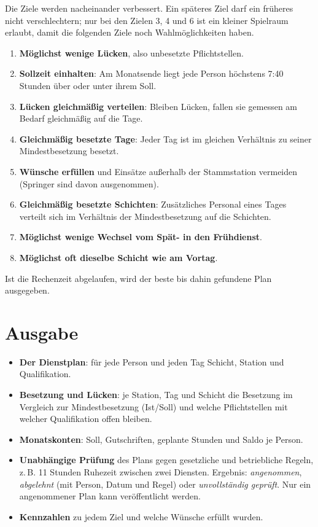\documentclass[11pt]{combiArticle}
\begin{document}
Die Ziele werden nacheinander verbessert. Ein späteres Ziel darf ein früheres nicht verschlechtern; nur bei den
Zielen 3, 4 und 6 ist ein kleiner Spielraum erlaubt, damit die folgenden Ziele noch Wahlmöglichkeiten haben.
\begin{enumerate}
  \item \textbf{Möglichst wenige Lücken}, also unbesetzte Pflichtstellen.
  \item \textbf{Sollzeit einhalten}: Am Monatsende liegt jede Person höchstens 7:40 Stunden über oder unter ihrem Soll.
  \item \textbf{Lücken gleichmäßig verteilen}: Bleiben Lücken, fallen sie gemessen am Bedarf gleichmäßig auf die Tage.
  \item \textbf{Gleichmäßig besetzte Tage}: Jeder Tag ist im gleichen Verhältnis zu seiner Mindestbesetzung besetzt.
  \item \textbf{Wünsche erfüllen} und Einsätze außerhalb der Stammstation vermeiden (Springer sind davon ausgenommen).
  \item \textbf{Gleichmäßig besetzte Schichten}: Zusätzliches Personal eines Tages verteilt sich im Verhältnis
        der Mindestbesetzung auf die Schichten.
  \item \textbf{Möglichst wenige Wechsel vom Spät- in den Frühdienst}.
  \item \textbf{Möglichst oft dieselbe Schicht wie am Vortag}.
\end{enumerate}

Ist die Rechenzeit abgelaufen, wird der beste bis dahin gefundene Plan ausgegeben.

\section{Ausgabe}

\begin{itemize}
  \item \textbf{Der Dienstplan}: für jede Person und jeden Tag Schicht, Station und Qualifikation.
  \item \textbf{Besetzung und Lücken}: je Station, Tag und Schicht die Besetzung im Vergleich zur Mindestbesetzung
        (Ist/Soll) und welche Pflichtstellen mit welcher Qualifikation offen bleiben.
  \item \textbf{Monatskonten}: Soll, Gutschriften, geplante Stunden und Saldo je Person.
  \item \textbf{Unabhängige Prüfung} des Plans gegen gesetzliche und betriebliche Regeln, z.\,B. 11 Stunden Ruhezeit
        zwischen zwei Diensten. Ergebnis: \emph{angenommen}, \emph{abgelehnt} (mit Person, Datum und Regel) oder
        \emph{unvollständig geprüft}. Nur ein angenommener Plan kann veröffentlicht werden.
  \item \textbf{Kennzahlen} zu jedem Ziel und welche Wünsche erfüllt wurden.
\end{itemize}
\end{document}

